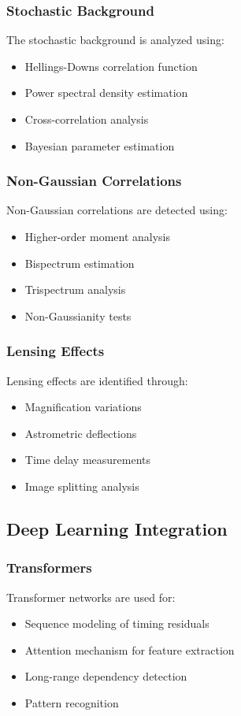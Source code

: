 \subsubsection{Stochastic Background}
The stochastic background is analyzed using:
\begin{itemize}
    \item Hellings-Downs correlation function
    \item Power spectral density estimation
    \item Cross-correlation analysis
    \item Bayesian parameter estimation
\end{itemize}

\subsubsection{Non-Gaussian Correlations}
Non-Gaussian correlations are detected using:
\begin{itemize}
    \item Higher-order moment analysis
    \item Bispectrum estimation
    \item Trispectrum analysis
    \item Non-Gaussianity tests
\end{itemize}

\subsubsection{Lensing Effects}
Lensing effects are identified through:
\begin{itemize}
    \item Magnification variations
    \item Astrometric deflections
    \item Time delay measurements
    \item Image splitting analysis
\end{itemize}

\subsection{Deep Learning Integration}

\subsubsection{Transformers}
Transformer networks are used for:
\begin{itemize}
    \item Sequence modeling of timing residuals
    \item Attention mechanism for feature extraction
    \item Long-range dependency detection
    \item Pattern recognition
\end{itemize}

